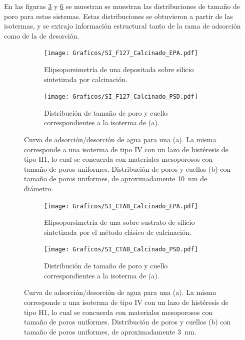 		 En las figuras \ref{fig:F127_PSD} y \ref{fig:CTAB_PSD} se muestran se muestran las distribuciones de tamaño de poro para estos sistemas. Estas distribuciones se obtuvieron a partir de las isotermas, y se extrajo información estructural tanto de la rama de adsorción como de la de desorción.


		     	  	\begin{figure}[!ht]
		     	  		\begin{subfigure}[t]{0.495\textwidth}
		     	  		\texttt{[image: Graficos/SI\_F127\_Calcinado\_EPA.pdf]}
						\caption{Elipsoporsimetría de una \pdmF\space depositada sobre silicio sintetizada por calcinación.}
						\label{fig:F127_EPA}
						\end{subfigure}
						\begin{subfigure}[t]{0.495\textwidth}
		     	  		\texttt{[image: Graficos/SI\_F127\_Calcinado\_PSD.pdf]}
						\caption{Distribución de tamaño de poro y cuello correspondientes a la isoterma de (a).}
						\label{fig:F127_PSD}
						\end{subfigure}
						\caption[Elipsoporosimetría para sistemas \pdmF.]{Curva de adsorción/desorción de agua para una \pdmF\space (a). La misma corresponde a una isoterma de tipo IV con un lazo de histéresis de tipo H1, lo cual se concuerda con materiales mesoporosos con tamaño de poros uniformes. Distribución de poros y cuellos (b) con tamaño de poros uniformes, de aproximadamente \SI{10}{\nm} de diámetro.}
						\end{figure}
					\begin{figure}[!ht]
		     	  		\begin{subfigure}[t]{0.495\textwidth}
		     	  		\texttt{[image: Graficos/SI\_CTAB\_Calcinado\_EPA.pdf]}
						\caption{Elipsoporsimetría de una \pdmF\space sobre sustrato de silicio sintetizada por el método clásico de calcinación.}
						\label{fig:CTAB_EPA}
						\end{subfigure}
						\begin{subfigure}[t]{0.495\textwidth}
		     	  		\texttt{[image: Graficos/SI\_CTAB\_Calcinado\_PSD.pdf]}
						\caption{Distribución de tamaño de poro y cuello correspondientes a la isoterma de (a).}
						\label{fig:CTAB_PSD}
						\end{subfigure}
						\caption[Elipsoporosimetría para sistemas \pdmC.]{Curva de adsorción/desorción de agua para una \pdmC\space (a). La misma corresponde a una isoterma de tipo IV con un lazo de histéresis de tipo H1, lo cual se concuerda con materiales mesoporosos con tamaño de poros uniformes. Distribución de poros y cuellos (b) con tamaño de poros uniformes, de aproximadamente \SI{3}{\nm}.}
						\end{figure}	
		
